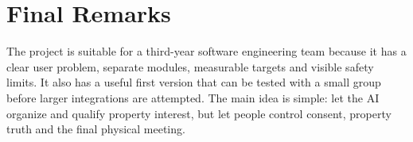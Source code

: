 \documentclass{tietreport}
\begin{document}
\section{Final Remarks}

The project is suitable for a third-year software engineering team because it
has a clear user problem, separate modules, measurable targets and visible
safety limits. It also has a useful first version that can be tested with a small
group before larger integrations are attempted. The main idea is simple: let the
AI organize and qualify property interest, but let people control consent,
property truth and the final physical meeting.

\printbibliography[heading=bibintoc]
\end{document}
